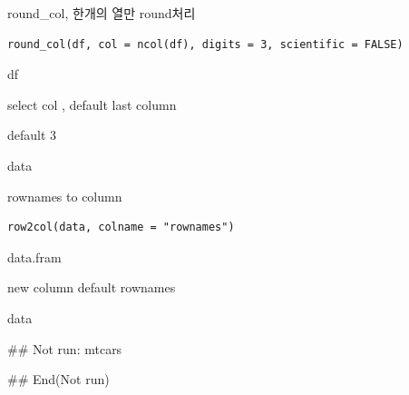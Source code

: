 \documentclass[a4paper]{book}
\begin{document}
%
\begin{Description}
round\_col, 한개의 열만 round처리
\end{Description}
%
\begin{Usage}
\begin{verbatim}
round_col(df, col = ncol(df), digits = 3, scientific = FALSE)
\end{verbatim}
\end{Usage}
%
\begin{Arguments}
\begin{ldescription}
\item[\code{df}] df

\item[\code{col}] select col , default last column

\item[\code{digits}] default 3
\end{ldescription}
\end{Arguments}
%
\begin{Value}
data
\end{Value}

%
\begin{Description}
rownames to column
\end{Description}
%
\begin{Usage}
\begin{verbatim}
row2col(data, colname = "rownames")
\end{verbatim}
\end{Usage}
%
\begin{Arguments}
\begin{ldescription}
\item[\code{data}] data.fram

\item[\code{colname}] new column default rownames
\end{ldescription}
\end{Arguments}
%
\begin{Value}
data
\end{Value}
%
\begin{Examples}
\begin{ExampleCode}

\#\# Not run: 
mtcars %

## End(Not run)

\end{ExampleCode}
\end{Examples}
\end{document}
